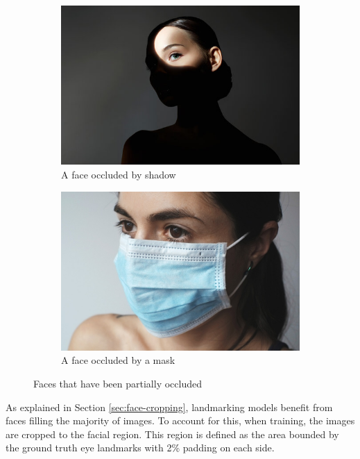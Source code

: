 \begin{figure}[h]
    \centering
    \begin{subfigure}{0.45\textwidth}
        \includegraphics[width=1\linewidth]{dissertation//figures/shadow.jpg}
        \caption{A face occluded by shadow}
        \label{fig:occlusion-shadow}
    \end{subfigure}
    \hfill
    \begin{subfigure}{0.45\textwidth}
        \includegraphics[width=1\linewidth]{dissertation//figures/occlusion-mask.jpg}
        \caption{A face occluded by a mask}
        \label{fig:occlusion:mask}
    \end{subfigure}
    \caption{Faces that have been partially occluded}
    \label{fig:occlusions}
\end{figure}

As explained in Section \ref{sec:face-cropping}, landmarking models benefit from faces filling the majority of images. To account for this, when training, the images are cropped to the facial region. This region is defined as the area bounded by the ground truth eye landmarks with 2\% padding on each side.

